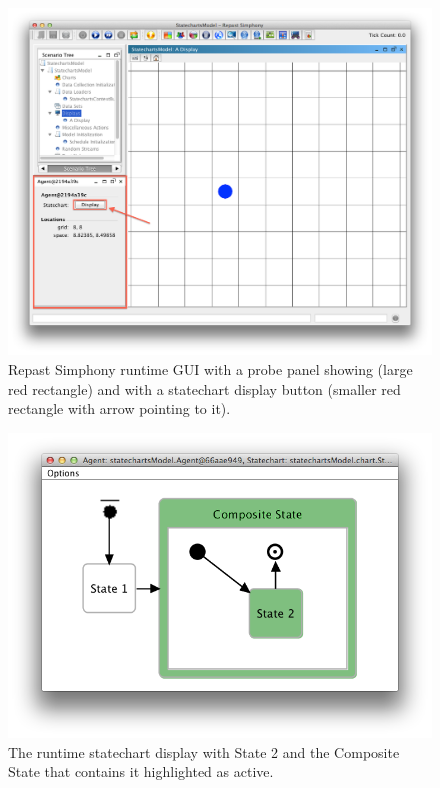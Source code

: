 \documentclass[11pt]{amsart}
\begin{document}
\begin{figure}
\begin{center}
\vspace{.2in}
\centerline {
\includegraphics[width=5in]{StatechartsImages/Probe.png}
}
\caption{Repast Simphony runtime GUI with a probe panel showing (large red rectangle) and with a statechart display button (smaller red rectangle with arrow pointing to it).}
\label{fig:probe}
\end{center}
\end{figure}

\begin{figure}
\begin{center}
\vspace{.2in}
\centerline {
\includegraphics[width=5in]{StatechartsImages/RuntimeStatechart.png}
}
\caption{The runtime statechart display with State 2 and the Composite State that contains it highlighted as active.}
\label{fig:runtimeStatechart}
\end{center}
\end{figure}
\end{document}
